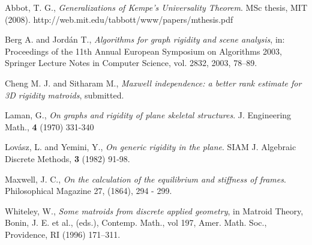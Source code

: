 \documentclass[11pt]{article}
\begin{document}
\begin{thebibliography}{99}

Abbot, T. G., {\it Generalizations of Kempe's Universality Theorem}.
MSc thesis, MIT (2008).
http://web.mit.edu/tabbott/www/papers/mthesis.pdf


 Berg A.  and Jord\'an T.,
{\it Algorithms for graph rigidity and scene analysis}, in:
Proceedings of the 11th Annual European Symposium on Algorithms
2003, Springer Lecture Notes in Computer Science, vol. 2832, 2003,
78--89.








 {Cheng M. J.  and Sitharam M.}, {\it Maxwell independence: a better
rank estimate for 3D rigidity matroids}, submitted.

 Laman, G.,
{\it On graphs and rigidity of plane skeletal structures}. J.
Engineering Math., {\bf 4} (1970) 331-340



 Lov\'asz, L. and  Yemini, Y.,
{\it On generic rigidity in the plane}. SIAM J. Algebraic Discrete
Methods, {\bf 3}  (1982) 91-98.


 Maxwell, J. C.,
{\it On the calculation of the equilibrium and stiffness of frames}.
Philosophical Magazine 27, (1864), 294 - 299.

Whiteley, W., {\it Some matroids from discrete applied geometry}, in
Matroid Theory, Bonin, J. E. et al., (eds.), Contemp. Math., vol
197, Amer. Math. Soc., Providence, RI (1996) 171--311.





\end{thebibliography}
\end{document}
